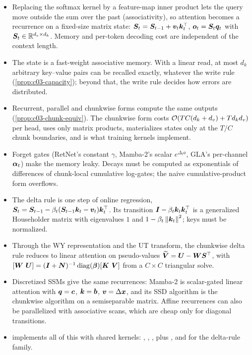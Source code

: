 \begin{summarybox}
\begin{itemize}
\item Replacing the softmax kernel by a feature-map inner product lets the query move outside
the sum over the past (associativity), so attention becomes a recurrence on a fixed-size matrix
state: $\bm{S}_t=\bm{S}_{t-1}+\bm{v}_t\bm{k}_t^{\top}$, $\bm{o}_t=\bm{S}_t\bm{q}_t$ with $\bm{S}_t\in\mathbb{R}^{d_v\times d_k}$.
Memory and per-token decoding cost are independent of the context length.
\item The state is a fast-weight associative memory. With a linear read, at most $d_k$ arbitrary
key--value pairs can be recalled exactly, whatever the write rule
(\cref{prop:c03-capacity}); beyond that, the write rule decides how errors are distributed.
\item Recurrent, parallel and chunkwise forms compute the same outputs
(\cref{prop:c03-chunk-equiv}). The chunkwise form costs $\mathcal{O}(TC(d_k+d_v)+Td_kd_v)$ per head,
uses only matrix products, materializes states only at the $T/C$ chunk boundaries, and is what
training kernels implement.
\item Forget gates (RetNet's constant $\gamma$, Mamba-2's scalar $e^{\Delta_ta}$, GLA's
per-channel $\bm{\alpha}_t$) make the memory leaky. Decays must be computed as exponentials of
differences of chunk-local cumulative log-gates; the naive cumulative-product form overflows.
\item The delta rule is one step of online regression, $\bm{S}_t=\bm{S}_{t-1}-\beta_t(\bm{S}_{t-1}\bm{k}_t-\bm{v}_t)\bm{k}_t^{\top}$.
Its transition $\bm{I}-\beta_t\bm{k}_t\bm{k}_t^{\top}$ is a generalized Householder matrix with eigenvalues $1$
and $1-\beta_t\left\lVert \bm{k}_t\right\rVert^2$; keys must be normalized.
\item Through the WY representation and the UT transform, the chunkwise delta rule reduces to
linear attention on pseudo-values $\widetilde{\bm{V}}=\bm{U}-\bm{W}\bm{S}^{\top}$, with
$[\mW\ \mU]=(\mI+\bm{N})^{-1}\diag(\vbeta)[\mK\ \mV]$ from a $C\times C$ triangular solve.
\item Discretized SSMs give the same recurrences: Mamba-2 is scalar-gated linear attention with
$\bm{q}=\bm{c}$, $\bm{k}=\bm{b}$, $\bm{v}=\Delta\bm{x}$, and its SSD algorithm is the chunkwise algorithm on a
semiseparable matrix. Affine recurrences can also be parallelized with associative scans, which
are cheap only for diagonal transitions.
\item \fla{} implements all of this with shared kernels: ,
, , plus , 
and  for the delta-rule family.
\end{itemize}
\end{summarybox}

